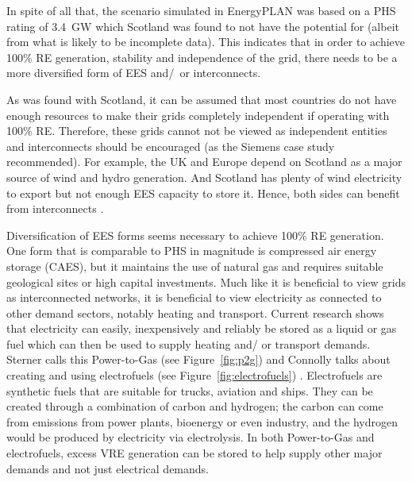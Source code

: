 In spite of all that, the scenario simulated in EnergyPLAN was based on a PHS rating of 3.4~GW which Scotland was found to not have the potential for (albeit from what is likely to be incomplete data).
This indicates that in order to achieve 100\% RE generation, stability and independence of the grid, there needs to be a more diversified form of EES and/~or interconnects.

As was found with Scotland, it can be assumed that most countries do not have enough resources to make their grids completely independent if operating with 100\% RE.
Therefore, these grids cannot not be viewed as independent entities and interconnects should be encouraged (as the Siemens case study recommended).
For example, the UK and Europe depend on Scotland as a major source of wind and hydro generation.
And Scotland has plenty of wind electricity to export but not enough EES capacity to store it.
Hence, both sides can benefit from interconnects \citep{Muller2015}.



Diversification of EES forms seems necessary to achieve 100\% RE generation.
One form that is comparable to PHS in magnitude is compressed air energy storage (CAES), but it maintains the use of natural gas and requires suitable geological sites or high capital investments.
Much like it is beneficial to view grids as interconnected networks, it is beneficial to view electricity as connected to other demand sectors, notably heating and transport.
Current research shows that electricity can easily, inexpensively and reliably be stored as a liquid or gas fuel which can then be used to supply heating and/ or transport demands.
Sterner calls this Power-to-Gas (see Figure~\ref{fig:p2g}) and Connolly talks about creating and using electrofuels (see Figure~\ref{fig:electrofuels}) \citep{Sterner2017, Electrofuels2016}.
Electrofuels are synthetic fuels that are suitable for trucks, aviation and ships.
They can be created through a combination of carbon and hydrogen; the carbon can come from emissions from power plants, bioenergy or even industry, and the hydrogen would be produced by electricity via electrolysis.
In both Power-to-Gas and electrofuels, excess VRE generation can be stored to help supply other major demands and not just electrical demands.




